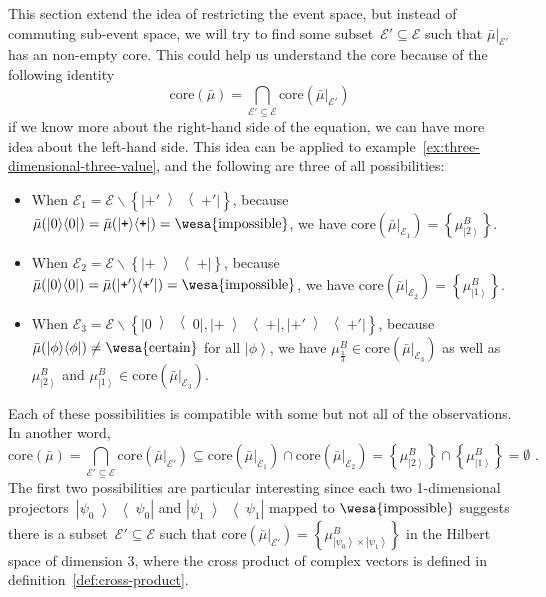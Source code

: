 \documentclass[12pt]{iopart}
\theoremstyle{plain}
\theoremstyle{definition}
\newcommand{\events}{\ensuremath{\mathcal{E}}}
\newcommand{\imposs}{{\mbox{\wesa{impossible}}}}
\newcommand{\necess}{{\mbox{\wesa{certain}}}}
\newcommand{\ket}[1]{{\left\vert{#1}\right\rangle}}
\newcommand{\op}[2]{\ensuremath{\left\vert{#1}\middle\rangle\middle\langle{#2}\right\vert}}
\newcommand{\proj}[1]{\op{#1}{#1}}
\newcommand{\ps}{\texttt{+}}
\begin{document}
This section extend the idea of restricting the event space, but instead
of commuting sub-event space, we will try to find some subset~$\events'\subseteq\events$
such that $\bar{\mu}|_{\events'}$ has an non-empty core. This could
help us understand the core because of the following identity
\begin{equation}
\mathrm{core}\left(\bar{\mu}\right)=\bigcap_{\events'\subseteq\events}\mathrm{core}\left(\bar{\mu}|_{\events'}\right)\label{eq:core-intersection}
\end{equation}
if we know more about the right-hand side of the equation, we can
have more idea about the left-hand side. This idea can be applied
to example~\ref{ex:three-dimensional-three-value}, and the following
are three of all possibilities:
\begin{itemize}
\item When $\events_{1}=\events\backslash\left\{ \proj{\ps'}\right\} $,
because $\bar{\mu}(\proj{0})=\bar{\mu}(\proj{\ps})=\imposs$, we have
$\mathrm{core}\left(\bar{\mu}|_{\events_{1}}\right)=\left\{ \mu_{\ket{2}}^{B}\right\} $.
\item When $\events_{2}=\events\backslash\left\{ \proj{\ps}\right\} $,
because $\bar{\mu}(\proj{0})=\bar{\mu}(\proj{\ps'})=\imposs$, we
have $\mathrm{core}\left(\bar{\mu}|_{\events_{2}}\right)=\left\{ \mu_{\ket{1}}^{B}\right\} $.
\item When $\events_{3}=\events\backslash\left\{ \proj{0},\proj{\ps},\proj{\ps'}\right\} $,
because $\bar{\mu}(\proj{\phi})\ne\necess$ for all $\ket{\phi}$,
we have $\mu_{\frac{\mathbb{1}}{3}}^{B}\in\mathrm{core}\left(\bar{\mu}|_{\events_{3}}\right)$
as well as $\mu_{\ket{2}}^{B}$ and $\mu_{\ket{1}}^{B}\in\mathrm{core}\left(\bar{\mu}|_{\events_{3}}\right)$.
\end{itemize}
Each of these possibilities is compatible with some but not all of
the observations. In another word, 
\begin{equation}
\mathrm{core}\left(\bar{\mu}\right)=\bigcap_{\events'\subseteq\events}\mathrm{core}\left(\bar{\mu}|_{\events'}\right)\subseteq\mathrm{core}\left(\bar{\mu}|_{\events_{1}}\right)\cap\mathrm{core}\left(\bar{\mu}|_{\events_{2}}\right)=\left\{ \mu_{\ket{2}}^{B}\right\} \cap\left\{ \mu_{\ket{1}}^{B}\right\} =\emptyset\textrm{ .}
\end{equation}
The first two possibilities are particular interesting since each
two 1-dimensional projectors~$\proj{\psi_{0}}$ and $\proj{\psi_{1}}$
mapped to $\imposs$ suggests there is a subset~$\events'\subseteq\events$
such that $\mathrm{core}\left(\bar{\mu}|_{\events'}\right)=\left\{ \mu_{\ket{\psi_{0}}\times\ket{\psi_{1}}}^{B}\right\} $
in the Hilbert space of dimension 3, where the cross product of complex
vectors is defined in definition~\ref{def:cross-product}. 
\end{document}
